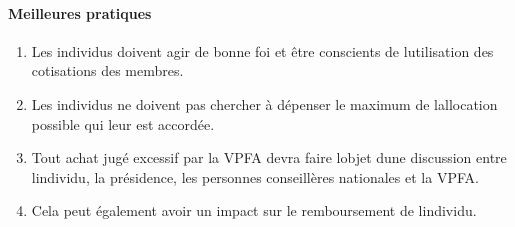 \paragraph{Meilleures pratiques}
\begin{enumerate}
 \item
  Les individus doivent agir de bonne foi et être conscients de l\textquotesingle utilisation des cotisations des membres.
 \item
  Les individus ne doivent pas chercher à dépenser le maximum de l\textquotesingle allocation possible qui leur est accordée.
 \item
  Tout achat jugé excessif par la VPFA devra faire l\textquotesingle objet d\textquotesingle une discussion entre l\textquotesingle individu, la présidence, les personnes conseillères nationales et la VPFA.
 \item
  Cela peut également avoir un impact sur le remboursement de l\textquotesingle individu.
\end{enumerate}

